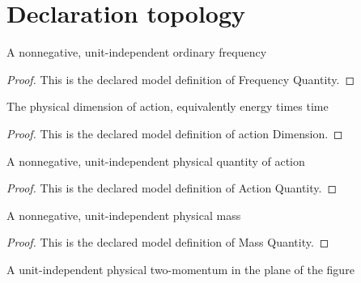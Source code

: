 \section{Declaration topology}
\begin{definition}
  \label{def:physics:phyx-mini-0548:phyxminiproblems-problemphyxmini0548-frequencyquantity}
  A nonnegative, unit-independent ordinary frequency
\end{definition}
\begin{proof}
  This is the declared model definition of Frequency Quantity.
\end{proof}
\begin{definition}
  \label{def:physics:phyx-mini-0548:phyxminiproblems-problemphyxmini0548-actiondimension}
  The physical dimension of action, equivalently energy times time
\end{definition}
\begin{proof}
  This is the declared model definition of action Dimension.
\end{proof}
\begin{definition}
  \label{def:physics:phyx-mini-0548:phyxminiproblems-problemphyxmini0548-actionquantity}
  A nonnegative, unit-independent physical quantity of action
\end{definition}
\begin{proof}
  This is the declared model definition of Action Quantity.
\end{proof}
\begin{definition}
  \label{def:physics:phyx-mini-0548:phyxminiproblems-problemphyxmini0548-massquantity}
  A nonnegative, unit-independent physical mass
\end{definition}
\begin{proof}
  This is the declared model definition of Mass Quantity.
\end{proof}
\begin{definition}
  \label{def:physics:phyx-mini-0548:phyxminiproblems-problemphyxmini0548-dimmomentum2d}
  A unit-independent physical two-momentum in the plane of the figure
\end{definition}
